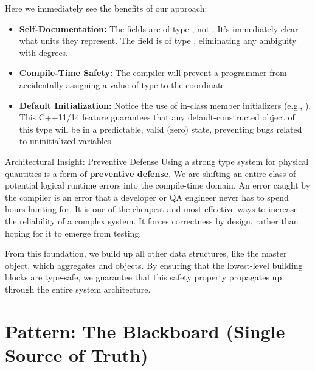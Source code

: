 Here we immediately see the benefits of our approach:
\begin{itemize}
    \item \textbf{Self-Documentation:} The fields  are of type , not . It's immediately clear what units they represent. The field  is of type , eliminating any ambiguity with degrees.
    \item \textbf{Compile-Time Safety:} The compiler will prevent a programmer from accidentally assigning a value of type  to the  coordinate.
    \item \textbf{Default Initialization:} Notice the use of in-class member initializers (e.g., ). This C++11/14 feature guarantees that any default-constructed object of this type will be in a predictable, valid (zero) state, preventing bugs related to uninitialized variables.
\end{itemize}

\begin{tipbox}{Architectural Insight: Preventive Defense}
Using a strong type system for physical quantities is a form of \textbf{preventive defense}. We are shifting an entire class of potential logical runtime errors into the compile-time domain. An error caught by the compiler is an error that a developer or QA engineer never has to spend hours hunting for. It is one of the cheapest and most effective ways to increase the reliability of a complex system. It forces correctness by design, rather than hoping for it to emerge from testing.
\end{tipbox}

From this foundation, we build up all other data structures, like the master  object, which aggregates  and  objects. By ensuring that the lowest-level building blocks are type-safe, we guarantee that this safety property propagates up through the entire system architecture.





\section{Pattern: The Blackboard (Single Source of Truth)}
\label{sec:pattern_blackboard}

